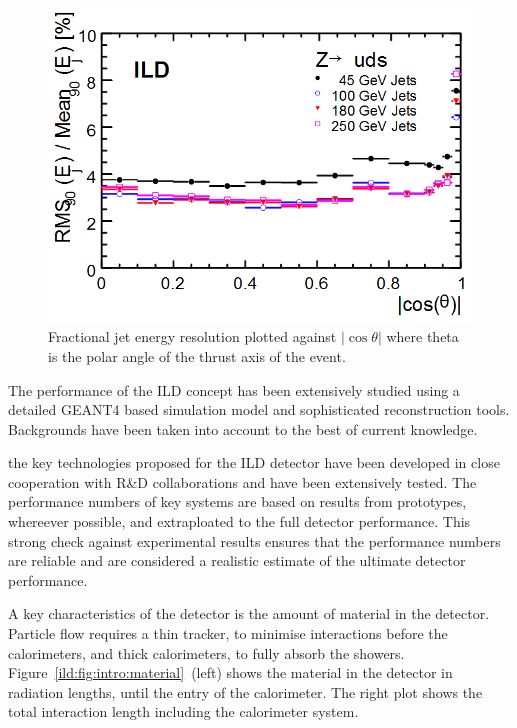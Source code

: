 \begin{figure}[t!]

\includegraphics[width=0.8\hsize]{figures/ild01_o1_pflow.png}

\caption{\label{ild:fig:intro:pflow}Fractional jet energy resolution
    plotted against $|\cos\theta|$ where theta is the polar angle of the thrust axis of the event. }
\end{figure}



The performance of the ILD concept has been extensively studied using a detailed GEANT4 based simulation model and sophisticated reconstruction tools. Backgrounds have been taken into account to the best of current knowledge. 

the key technologies proposed for the ILD detector have been developed in close cooperation with R\&D collaborations and have been extensively tested. The performance numbers of key systems are based on results from prototypes, whereever possible, and extraploated to the full detector performance. This strong check against experimental results ensures that the performance numbers are reliable and are considered a realistic estimate of the ultimate detector performance. 


A key characteristics of the detector is the amount of material in the detector. Particle flow requires a thin tracker, to minimise interactions before the calorimeters, and thick calorimeters, to fully absorb the showers. Figure~\ref{ild:fig:intro:material}~(left) shows the material in the detector in radiation lengths, until the entry of the calorimeter. The right plot shows the total interaction length including the calorimeter system. 

